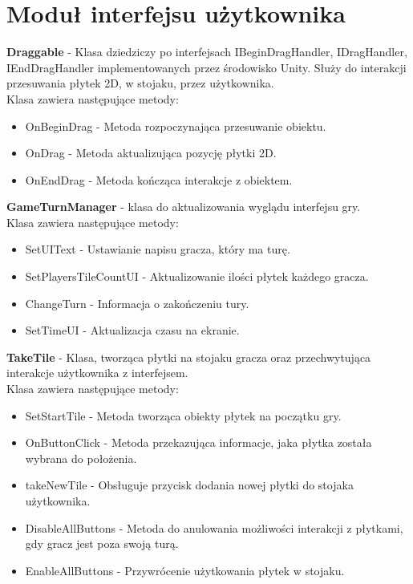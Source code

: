 \documentclass[a4paper,twoside,12pt]{book}
\begin{document}
	\section{Moduł interfejsu użytkownika}
	
	\textbf{Draggable} - Klasa dziedziczy po interfejsach  IBeginDragHandler, IDragHandler, IEndDragHandler implementowanych przez środowisko Unity. Służy do interakcji przesuwania płytek 2D, w stojaku, przez użytkownika.\\ Klasa zawiera następujące metody:
		\begin{itemize}
			\item OnBeginDrag - Metoda rozpoczynająca przesuwanie obiektu.
			\item OnDrag - Metoda aktualizująca pozycję płytki 2D.
			\item OnEndDrag - Metoda kończąca interakcje z obiektem.
		\end{itemize}
	
	
	\textbf{GameTurnManager} - klasa do aktualizowania wyglądu interfejsu gry.\\ Klasa zawiera następujące metody:
		\begin{itemize}
			\item SetUIText - Ustawianie napisu gracza, który ma turę.
			\item SetPlayersTileCountUI - Aktualizowanie ilości płytek każdego gracza.
			\item ChangeTurn - Informacja o zakończeniu tury.
			\item SetTimeUI - Aktualizacja czasu na ekranie.
			
		\end{itemize}
	
	
	\textbf{TakeTile} - Klasa, tworząca płytki na stojaku gracza oraz przechwytująca interakcje użytkownika z interfejsem.\\ Klasa zawiera następujące metody:
		\begin{itemize}
			\item SetStartTile - Metoda tworząca obiekty płytek na początku gry.
			\item OnButtonClick - Metoda przekazująca informacje, jaka płytka została wybrana do położenia.
			\item takeNewTile - Obsługuje przycisk dodania nowej płytki do stojaka użytkownika.
			\item DisableAllButtons - Metoda do anulowania możliwości interakcji z płytkami, gdy gracz jest poza swoją turą.
			\item EnableAllButtons - Przywrócenie użytkowania płytek w stojaku.
		\end{itemize}
	
\end{document}
